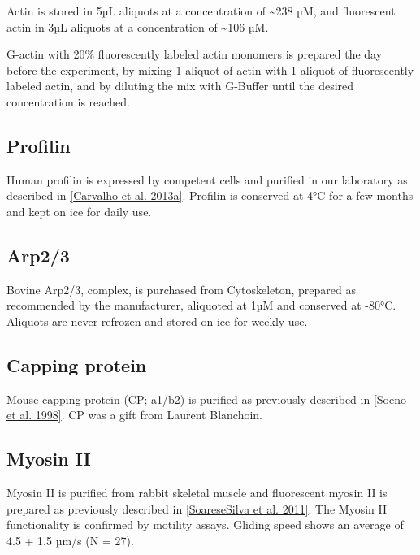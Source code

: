 \documentclass[A4paperpaper,11pt,english]{sphinxmanual}
\begin{document}
Actin is stored in 5µL aliquots at a concentration of \textasciitilde{}238 µM, and
fluorescent actin in 3µL aliquots at a concentration of \textasciitilde{}106 µM.

G-actin with 20\% fluorescently labeled actin monomers is prepared the day before
the experiment, by mixing 1 aliquot of actin with 1 aliquot of fluorescently
labeled actin, and by diluting the mix with G-Buffer until the desired concentration is reached.


\subsection{Profilin}
\label{index-latex:profilin}
Human profilin is expressed by competent cells and purified in our laboratory as
described in {\hyperref[index-latex:carvalho2013a]{{[}Carvalho et al. 2013a{]}}}.  Profilin is conserved at 4°C for a few months and
kept on ice for daily use.


\subsection{Arp2/3}
\label{index-latex:arp2-3}
Bovine Arp2/3, complex, is purchased from Cytoskeleton, prepared as recommended by the manufacturer, aliquoted at 1µM
and conserved at -80°C.  Aliquots are never refrozen and stored on ice for
weekly use.


\subsection{Capping protein}
\label{index-latex:capping-protein}
Mouse capping protein (CP; a1/b2) is purified as previously described in {\hyperref[index-latex:soeno1998]{{[}Soeno et al. 1998{]}}}. CP was a gift from Laurent Blanchoin.


\subsection{Myosin II}
\label{index-latex:myosin-ii}
Myosin II is purified from rabbit skeletal muscle and fluorescent myosin II is
prepared as previously described in {\hyperref[index-latex:soaresesilva2011]{{[}SoareseSilva et al. 2011{]}}}. The Myosin II functionality
is confirmed by motility assays. Gliding speed shows an average of 4.5
+ 1.5 µm/s (N = 27).
\end{document}
